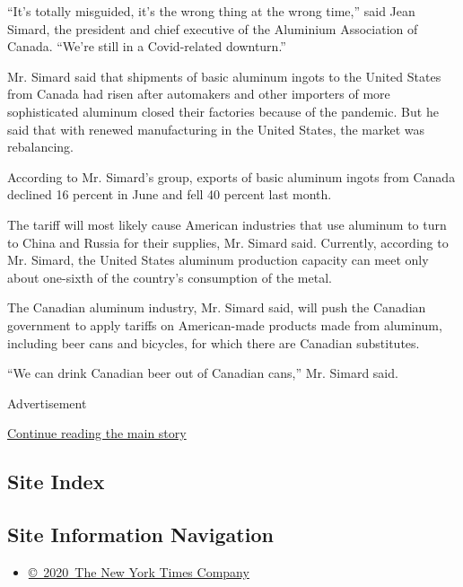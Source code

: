 ``It's totally misguided, it's the wrong thing at the wrong time,'' said
Jean Simard, the president and chief executive of the Aluminium
Association of Canada. ``We're still in a Covid-related downturn.''

Mr. Simard said that shipments of basic aluminum ingots to the United
States from Canada had risen after automakers and other importers of
more sophisticated aluminum closed their factories because of the
pandemic. But he said that with renewed manufacturing in the United
States, the market was rebalancing.

According to Mr. Simard's group, exports of basic aluminum ingots from
Canada declined 16 percent in June and fell 40 percent last month.

The tariff will most likely cause American industries that use aluminum
to turn to China and Russia for their supplies, Mr. Simard said.
Currently, according to Mr. Simard, the United States aluminum
production capacity can meet only about one-sixth of the country's
consumption of the metal.

The Canadian aluminum industry, Mr. Simard said, will push the Canadian
government to apply tariffs on American-made products made from
aluminum, including beer cans and bicycles, for which there are Canadian
substitutes.

``We can drink Canadian beer out of Canadian cans,'' Mr. Simard said.

Advertisement

\protect\hyperlink{after-bottom}{Continue reading the main story}

\hypertarget{site-index}{%
\subsection{Site Index}\label{site-index}}

\hypertarget{site-information-navigation}{%
\subsection{Site Information
Navigation}\label{site-information-navigation}}

\begin{itemize}
\tightlist
\item
  \href{https://help.nytimes3xbfgragh.onion/hc/en-us/articles/115014792127-Copyright-notice}{©~2020~The
  New York Times Company}
\end{itemize}

